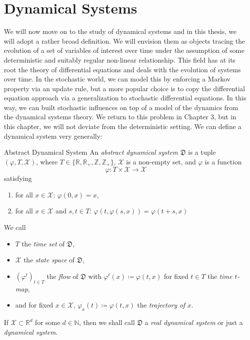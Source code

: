\documentclass[11pt, a4paper]{memoir}
\theoremstyle{break}
\theoremstyle{break}
\theoremstyle{nonumberplain}
\newcommand{\mN}{\mathbb{N}}
\newcommand{\mZ}{\mathbb{Z}}
\newcommand{\mR}{\mathbb{R}}
\begin{document}
\section{Dynamical Systems}
We will now move on to the study of dynamical systems and in this thesis, we will adopt a rather broad definition. We will envision them as objects tracing the evolution of a set of variables of interest over time under the assumption of some deterministic and suitably regular non-linear relationship. This field has at its root the theory of differential equations and deals with the evolution of systems over time. In the stochastic world, we can model this by enforcing a Markov property via an update rule, but a more popular choice is to copy the differential equation approach via a generalization to stochastic differential equations. In this way, we can built stochastic influences on top of a model of the dynamics from the dynamical systems theory. We return to this problem in Chapter 3, but in this chapter, we will not deviate from the deterministic setting. We can define a dynamical system very generally:
\begin{mydefinition}{Abstract Dynamical System}
An \emph{abstract dynamical system} $\mathfrak{D}$ is a tuple $(\varphi, T,\mathcal{X})$, where $T\in \{\mR,\mR_+,\mZ,\mZ_+\}$, $\mathcal{X}$ is a non-empty set, and $\varphi$ is a function
$$\varphi: T\times \mathcal{X}\to \mathcal{X}$$
satisfying
\begin{enumerate}[label=(\roman*)]
	\item for all $x\in \mathcal{X}$: $\varphi(0,x)=x$,
	\item for all $x\in \mathcal{X}$ and $s,t \in T$: $\varphi(t,\varphi(s,x))=\varphi(t+s,x)$
\end{enumerate}
We call 
\begin{itemize}
\item $T$ the \emph{time set} of $\mathfrak{D}$, 
\item $\mathcal{X}$ the \emph{state space} of $\mathfrak{D}$, 
\item $(\varphi^t)_{t\in T}$ the \emph{flow} of $\mathfrak{D}$ with
$\varphi^t(x)\coloneqq \varphi(t,x)$ for fixed $t\in T$ the \emph{time $t$-map},
\item and for fixed $x\in \mathcal{X}$, $\varphi_x(t)\coloneqq \varphi(t,x)$ the \emph{trajectory of $x$}.
\end{itemize}
If $\mathcal{X}\subset \mR^d$ for some $d\in \mN$, then we shall call $\mathfrak{D}$ a \emph{real dynamical system} or just a \emph{dynamical system}.
\end{mydefinition}
\end{document}
